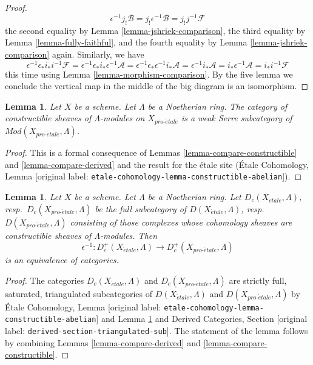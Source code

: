 \documentclass[10pt,a4paper]{article}
\theoremstyle{plain}
\newtheorem{lemma}[subsection]{Lemma}
\theoremstyle{definition}
\theoremstyle{remark}
\numberwithin{equation}{subsection}
\def\proetale{{pro\text{-}\acute{e}tale}}
\def\etale{{\acute{e}tale}}
\begin{document}
\begin{proof}
$$\epsilon^{-1}j_!\mathcal{B} =
j_!\epsilon^{-1}\mathcal{B} =
j_!j^{-1}\mathcal{F}
$$
the second equality by Lemma \ref{lemma-jshriek-comparison},
the third equality by Lemma \ref{lemma-fully-faithful}, and the
fourth equality by Lemma \ref{lemma-jshriek-comparison} again.
Similarly, we have
$$
\epsilon^{-1}\epsilon_*i_*i^{-1}\mathcal{F} =
\epsilon^{-1}\epsilon_*i_*\epsilon^{-1}\mathcal{A} =
\epsilon^{-1}\epsilon_*\epsilon^{-1}i_*\mathcal{A} =
\epsilon^{-1}i_*\mathcal{A} =
i_*\epsilon^{-1}\mathcal{A} =
i_*i^{-1}\mathcal{F}
$$
this time using Lemma \ref{lemma-morphism-comparison}.
By the five lemma we conclude the
vertical map in the middle of the big diagram is an isomorphism.
\end{proof}

\begin{lemma}
\label{lemma-constructible-serre}
Let $X$ be a scheme. Let $\Lambda$ be a Noetherian ring.
The category of constructible sheaves of $\Lambda$-modules on $X_\proetale$
is a weak Serre subcategory of $\textit{Mod}(X_\proetale, \Lambda)$.
\end{lemma}

\begin{proof}
This is a formal consequence of
Lemmas \ref{lemma-compare-constructible} and \ref{lemma-compare-derived}
and the result for the \'etale site
(\'Etale Cohomology, Lemma \textnormal{[original label: \nolinkurl{etale-cohomology-lemma-constructible-abelian}]}).
\end{proof}

\begin{lemma}
\label{lemma-compare-constructible-derived}
Let $X$ be a scheme. Let $\Lambda$ be a Noetherian ring.
Let $D_c(X_\etale, \Lambda)$, resp.\ $D_c(X_\proetale, \Lambda)$
be the full subcategory of
$D(X_\etale, \Lambda)$, resp.\ $D(X_\proetale, \Lambda)$
consisting of those complexes whose cohomology sheaves are
constructible sheaves of $\Lambda$-modules. Then
$$
\epsilon^{-1} :
D_c^+(X_\etale, \Lambda)
\longrightarrow
D_c^+(X_\proetale, \Lambda)
$$
is an equivalence of categories.
\end{lemma}

\begin{proof}
The categories $D_c(X_\etale, \Lambda)$ and $D_c(X_\proetale, \Lambda)$
are strictly full, saturated, triangulated subcategories of
$D(X_\etale, \Lambda)$ and $D(X_\proetale, \Lambda)$ by
\'Etale Cohomology, Lemma \textnormal{[original label: \nolinkurl{etale-cohomology-lemma-constructible-abelian}]}
and
Lemma \ref{lemma-constructible-serre}
and
Derived Categories, Section \textnormal{[original label: \nolinkurl{derived-section-triangulated-sub}]}.
The statement of the lemma follows by combining
Lemmas \ref{lemma-compare-derived} and
\ref{lemma-compare-constructible}.
\end{proof}
\end{document}
